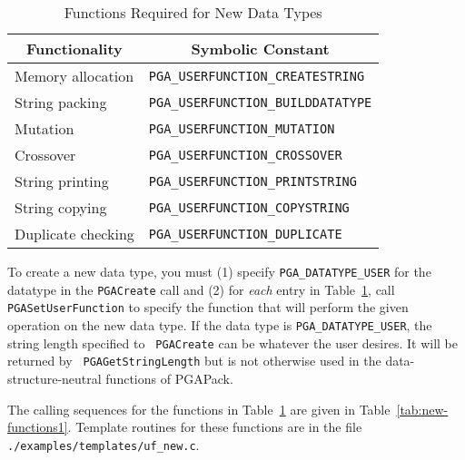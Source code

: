 \documentclass{report}
\newcommand{\pga}{PGAPack}
\begin{document}
\begin{table}
\centering
\caption
{
Functions Required for New Data Types\label{tab:new-functions}
}
\begin{tabular}{|l|l|} \hline\hline
\multicolumn{1}{|c|}{Functionality} &
\multicolumn{1}{c|}{Symbolic Constant} \\ \hline
Memory allocation & {\tt PGA\_USERFUNCTION\_CREATESTRING} \\
String packing & {\tt PGA\_USERFUNCTION\_BUILDDATATYPE} \\
Mutation & {\tt PGA\_USERFUNCTION\_MUTATION} \\
Crossover & {\tt PGA\_USERFUNCTION\_CROSSOVER} \\
String printing & {\tt PGA\_USERFUNCTION\_PRINTSTRING} \\
String copying & {\tt PGA\_USERFUNCTION\_COPYSTRING} \\
Duplicate checking & {\tt PGA\_USERFUNCTION\_DUPLICATE} \\
\hline
\end{tabular}
\end{table}

To create a new data type, you must (1) specify {\tt PGA\_DATATYPE\_USER} for
the datatype in the {\tt PGACreate} call and (2) for {\em each} entry in
Table~\ref{tab:new-functions}, call {\tt PGASetUserFunction} to specify the
function that will perform the given operation on the new data type.  If the
data type is {\tt PGA\_DATATYPE\_USER}, the string length specified to {\tt
PGACreate} can be whatever the user desires.  It will be returned by {\tt
PGAGetStringLength} but is not otherwise used in the data-structure-neutral
functions of \pga.

The calling sequences for the functions in Table~\ref{tab:new-functions} are
given in Table~\ref{tab:new-functions1}. Template routines for these functions
are in the file {\tt ./examples/templates/uf\_new.c}.
\end{document}
